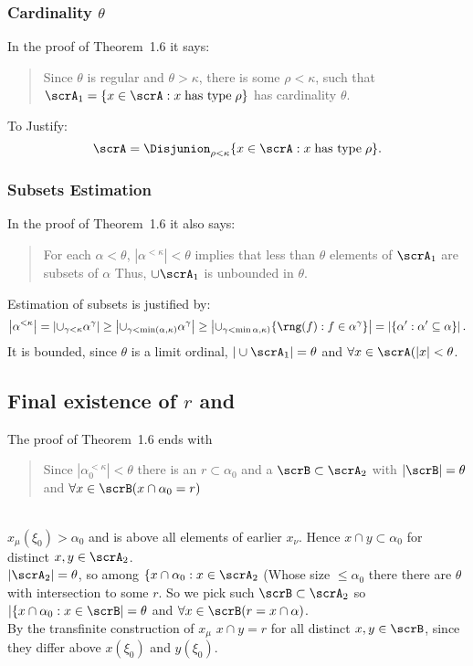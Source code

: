 \subsubsection{Cardinality \(\theta\)}
In the proof of Theorem~1.6 it says:
\begin{quote}
Since \(\theta\) is regular and \(\theta > \kappa\), 
there is some \(\rho < \kappa\), such that
 \(\scrA_1 = \{x\in\scrA: x \;\textnormal{has type}\; \rho\}\)
has cardinality \(\theta\).
\end{quote}
To Justify:
\begin{equation*}
\scrA = \mathsmaller{\Disjunion_{\rho<\kappa}} 
  \{x\in\scrA: x \;\textnormal{has type}\; \rho\}.
\end{equation*}

\subsubsection{Subsets Estimation}

In the proof of Theorem~1.6 it also says:
\begin{quote}
For each \(\alpha < \theta\), \(|\alpha^{<\kappa}| < \theta\)
implies that less than \(\theta\) elements of \(\scrA_1\) are
subsets of \(\alpha\) Thus, \(\cup \scrA_1\) is unbounded in \(\theta\).
\end{quote}
Estimation of subsets is justified by:
\begin{equation*}
\left|\alpha^{<\kappa}\right| 
  = \left|\cup_{\gamma<\kappa}\alpha^\gamma\right|
  \geq \left|\cup_{\gamma<\min(\alpha,\kappa)}\alpha^\gamma\right|
  \geq \left|\cup_{\gamma<\min\alpha,\kappa)} 
    \{\rng(f): f\in \alpha^\gamma\}\right|
  = \left|\{\alpha': \alpha'\subseteq \alpha\}\right|.
\end{equation*}
It is bounded, since \(\theta\) is a limit ordinal, 
\(|\cup \scrA_1|=\theta\) and \(\forall x\in\scrA (|x|<\theta\).

\subsection{Final existence of $r$ and \scrB}

The proof of Theorem~1.6 ends with
\begin{quote}
Since \(|\alpha_0^{<\kappa}| < \theta\)
there is an \(r \subset \alpha_0\) and a
\(\scrB \subset \scrA_2\) with \(|\scrB| = \theta\)
  and \(\forall x \in \scrB (x \cap \alpha_0 = r)\)
\end{quote}

 \\
\(x_\mu(\xi_0)> \alpha_0\) and is above all elements of earlier \(x_\nu\).
Hence \(x\cap y\subset\alpha_0\) for distinct \(x,y\in\scrA_2\).
\\
\(|\scrA_2|=\theta\), so among \(\{x\cap \alpha_0:x\in\scrA_2\)
(Whose size \(\leq \alpha_0\)
there there are \(\theta\) with intersection to some $r$.
So we pick such \(\scrB \subset \scrA_2\)
so \(|\{x\cap \alpha_0:x\in\scrB|=\theta\)
and \(\forall x\in\scrB (r = x\cap \alpha)\).
\\
By the transfinite construction of \(x_\mu\)
\(x\cap y = r\) for all distinct \(x,y\in\scrB\),
since they differ above \(x(\xi_0)\) and \(y(\xi_0)\).

